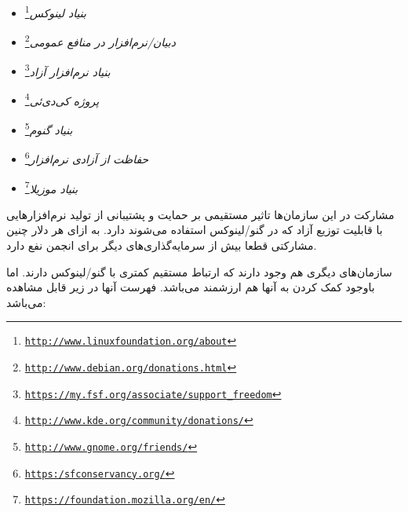 \begin{itemize}
\item
\emph{بنیاد لینوکس}\footnote{\texttt{\url{http://www.linuxfoundation.org/about}}}

\item
\emph{دبیان/نرم‌افزار در منافع عمومی}\footnote{\texttt{\url{http://www.debian.org/donations.html}}}

\item
\emph{بنیاد نرم‌افزار آزاد}\footnote{\texttt{\url{https://my.fsf.org/associate/support_freedom}}}

\item
\emph{پروژه کی‌دی‌ئی}\footnote{\texttt{\url{http://www.kde.org/community/donations/}}}

\item
\emph{بنیاد گنوم}\footnote{\texttt{\url{http://www.gnome.org/friends/}}}

\item
\emph{حفاظت از آزادی نرم‌افزار}\footnote{\texttt{\url{https:/sfconservancy.org/}}}

\item 
\emph{بنیاد موزیلا}\footnote{\texttt{\url{https://foundation.mozilla.org/en/}}}
\end{itemize}

مشارکت در این سازمان‌ها تاثیر مستقیمی بر حمایت و پشتیبانی از تولید
نرم‌افزارهایی با قابلیت توزیع آزاد که در گنو/لینوکس استفاده می‌شوند دارد.
به ازای هر دلار چنین مشارکتی قطعا بیش از سرمایه‌گذاری‌های دیگر برای انجمن نفع دارد.

سازمان‌های دیگری هم وجود دارند که ارتباط مستقیم کمتری با گنو/لینوکس دارند.
اما باوجود کمک کردن به آنها هم ارزشمند می‌باشد. فهرست آنها در زیر قابل مشاهده می‌باشد:

